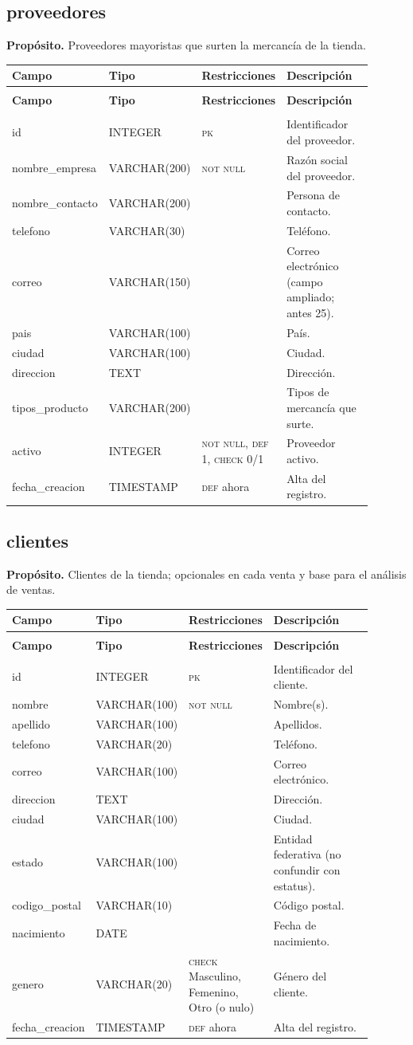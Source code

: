 \documentclass[11pt]{article}
\makeatletter
\newenvironment{campos}{%
  \par\footnotesize
  \setlength{\LTpre}{0.3ex}\setlength{\LTpost}{0.6ex}
  \begin{longtable}{@{}>{\ttfamily}p{0.165\linewidth} >{\ttfamily}p{0.150\linewidth} p{0.205\linewidth} >{\raggedright\arraybackslash}p{0.385\linewidth}@{}}
  \toprule
  \normalfont\bfseries Campo & \normalfont\bfseries Tipo & \normalfont\bfseries Restricciones & \normalfont\bfseries Descripción \\
  \midrule \endfirsthead
  \multicolumn{4}{@{}l}{\footnotesize\itshape \dots\ continuación}\\[0.3ex]
  \toprule
  \normalfont\bfseries Campo & \normalfont\bfseries Tipo & \normalfont\bfseries Restricciones & \normalfont\bfseries Descripción \\
  \midrule \endhead
  \midrule \multicolumn{4}{r@{}}{\footnotesize\itshape continúa en la siguiente página}\\ \endfoot
  \bottomrule \endlastfoot
}{%
  \end{longtable}\par
}
\newcommand{\proposito}[1]{\par\vspace{0.2ex}\noindent\colorbox{brandlight}{\parbox{\dimexpr\linewidth-2\fboxsep}{\small\textbf{Propósito.} #1}}\par\vspace{0.8ex}}
\newcommand{\pk}{\textsc{pk}}
\newcommand{\nn}{\textsc{not null}}
\makeatother
\begin{document}
\subsection{proveedores}
\proposito{Proveedores mayoristas que surten la mercancía de la tienda.}
\begin{campos}
id              & INTEGER      & \pk{}      & Identificador del proveedor. \\
nombre\_empresa & VARCHAR(200) & \nn        & Razón social del proveedor. \\
nombre\_contacto & VARCHAR(200) &           & Persona de contacto. \\
telefono        & VARCHAR(30)  &            & Teléfono. \\
correo          & VARCHAR(150) &            & Correo electrónico (campo ampliado; antes 25). \\
pais            & VARCHAR(100) &            & País. \\
ciudad          & VARCHAR(100) &            & Ciudad. \\
direccion       & TEXT         &            & Dirección. \\
tipos\_producto & VARCHAR(200) &            & Tipos de mercancía que surte. \\
activo          & INTEGER      & \nn, \textsc{def} 1, \textsc{check} 0/1 & Proveedor activo. \\
fecha\_creacion & TIMESTAMP    & \textsc{def} ahora & Alta del registro. \\
\end{campos}

\subsection{clientes}
\proposito{Clientes de la tienda; opcionales en cada venta y base para el análisis de ventas.}
\begin{campos}
id             & INTEGER      & \pk{}      & Identificador del cliente. \\
nombre         & VARCHAR(100) & \nn        & Nombre(s). \\
apellido       & VARCHAR(100) &            & Apellidos. \\
telefono       & VARCHAR(20)  &            & Teléfono. \\
correo         & VARCHAR(100) &            & Correo electrónico. \\
direccion      & TEXT         &            & Dirección. \\
ciudad         & VARCHAR(100) &            & Ciudad. \\
estado         & VARCHAR(100) &            & Entidad federativa (no confundir con estatus). \\
codigo\_postal & VARCHAR(10)  &            & Código postal. \\
nacimiento     & DATE         &            & Fecha de nacimiento. \\
genero         & VARCHAR(20)  & \textsc{check} Masculino, Femenino, Otro (o nulo) & Género del cliente. \\
fecha\_creacion & TIMESTAMP   & \textsc{def} ahora & Alta del registro. \\
\end{campos}
\end{document}
